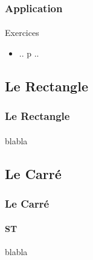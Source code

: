 \documentclass{beamer}
\begin{document}
\begin{frame}
	\frametitle{Application}  
	\framesubtitle{}
	
	\begin{block}{Exercices}
		\begin{itemize}
			\item .. p ..
		\end{itemize}
	\end{block}
\end{frame}

\subsection{Le Rectangle}

\begin{frame}
\frametitle{Le Rectangle}  
\framesubtitle{}
blabla
\end{frame}

\subsection{Le Carré}

\begin{frame}
\frametitle{Le Carré}  
\framesubtitle{ST}
blabla
\end{frame}
\end{document}
